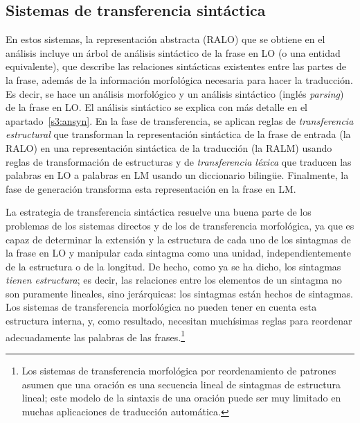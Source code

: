 \subsection{Sistemas de transferencia sintáctica} \label{s3:transyn} 

En estos sistemas, la representación abstracta (RALO) que se obtiene en el análisis incluye un árbol de análisis sintáctico de la frase en LO (o una entidad equivalente), que describe las relaciones sintácticas existentes entre las partes de la frase, además de la información morfológica necesaria para hacer la traducción. Es decir, se hace un análisis morfológico y un análisis sintáctico (inglés \emph{parsing}) de la frase en LO. El análisis sintáctico se explica con más detalle en el apartado~\ref{s3:ansyn}. En la fase de transferencia, se aplican reglas de \emph{transferencia estructural} que transforman la representación sintáctica de la frase de entrada (la RALO) en una representación sintáctica de la traducción (la RALM) usando reglas de transformación de estructuras y de \emph{transferencia léxica} que traducen las palabras en LO a palabras en LM usando un diccionario bilingüe. Finalmente, la fase de generación transforma esta representación en la frase en LM. 

La estrategia de transferencia sintáctica resuelve una buena parte de los problemas de los sistemas directos y de los de transferencia morfológica, ya que es capaz de determinar la extensión y la estructura de cada uno de los sintagmas de la frase en LO y manipular cada sintagma como una unidad, independientemente de la estructura o de la longitud. De hecho, como ya se ha dicho, los sintagmas \emph{tienen estructura}; es decir, las relaciones entre los elementos de un sintagma no son puramente lineales, sino jerárquicas: los sintagmas están hechos de sintagmas. Los sistemas de transferencia morfológica no pueden tener en cuenta esta estructura interna, y, como resultado, necesitan muchísimas reglas para reordenar adecuadamente las palabras de las frases.\footnote{Los sistemas de transferencia morfológica por reordenamiento de patrones asumen que una oración es una secuencia lineal de sintagmas de estructura lineal; este modelo de la sintaxis de una oración puede ser muy limitado en muchas aplicaciones de traducción automática.} 

